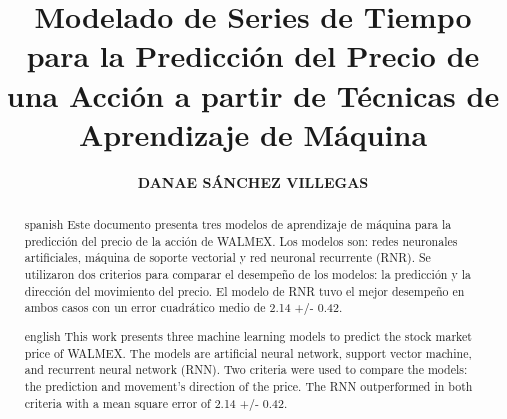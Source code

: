 \documentclass{tesisITAM}
\title{Modelado de Series de Tiempo para la Predicción del Precio de una Acción a partir de Técnicas de Aprendizaje de Máquina}
\author{\textbf{DANAE SÁNCHEZ VILLEGAS}}
\begin{document}
	\maketitle
	\publicationrights


	\begin{abstract}{spanish}
		Este documento presenta tres modelos de aprendizaje de máquina para la predicción del precio de la acción de WALMEX. Los modelos son: redes neuronales artificiales, máquina de soporte vectorial y red neuronal recurrente (RNR). Se utilizaron dos criterios para comparar el desempeño de los modelos: la predicción y la dirección del movimiento del precio. El modelo de RNR tuvo el mejor desempeño en ambos casos con un error cuadrático medio de 2.14 +/- 0.42.
	\end{abstract}

	\begin{abstract}{english}
		This work presents three machine learning models to predict the stock market price of WALMEX. The models are artificial neural network, support vector machine, and recurrent neural network (RNN). Two criteria were used to compare the models: the prediction and movement's direction of the price. The RNN outperformed in both criteria with a mean square error of 2.14 +/- 0.42. 
	\end{abstract}


	\setcounter{page}{1}

	\tableofcontents
	\listoffigures
	\listoftables
	\newpage

	\setcounter{page}{1}

	 
	
    
    
    



 

	\appendix
\end{document}
